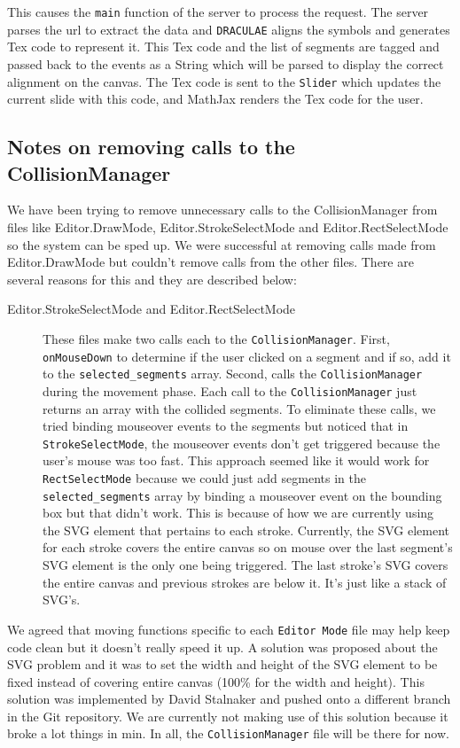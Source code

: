 \documentclass[letterpaper]{article}
\begin{document}
This causes the \verb+main+ function of the server to process the request. The server parses
the url to extract the data and \verb+DRACULAE+ aligns the symbols and generates Tex code to
represent it. This Tex code and the list of segments are tagged and passed back to the events
as a String which will be parsed to display the correct alignment on the canvas. The Tex code
is sent to the \verb+Slider+ which updates the current slide with this code, and MathJax renders
the Tex code for the user.

\subsection*{Notes on removing calls to the CollisionManager}
We have been trying to remove unnecessary calls to the CollisionManager from files like
Editor.DrawMode, Editor.StrokeSelectMode and Editor.RectSelectMode so the system can be sped up.
We were successful at removing calls made from Editor.DrawMode but couldn't remove calls
from the other files. There are several reasons for this and they are described below:

\begin{description}
	\item[Editor.StrokeSelectMode and Editor.RectSelectMode] These files make two calls each to
		the \verb+CollisionManager+. First, \verb+onMouseDown+ to determine if the user
		clicked on a segment and if so, add it to the \verb+selected_segments+ array. Second,
		calls the \verb+CollisionManager+ during the movement phase. Each call to the
		\verb+CollisionManager+ just returns an array with the collided segments. To eliminate
		these calls, we tried binding mouseover events to the segments but noticed that in
		\verb+StrokeSelectMode+, the mouseover events don't get triggered because the user's
		mouse was too fast. This approach seemed like it would work for \verb+RectSelectMode+
		because we could just add segments in the \verb+selected_segments+ array by binding a
		mouseover event on the bounding box but that didn't work. This is because of how we are
		currently using the SVG element that pertains to each stroke. Currently, the SVG element
		for each stroke covers the entire canvas so on mouse over the last segment's SVG element
		is the only one being triggered. The last stroke's SVG covers the entire canvas and
		previous strokes are below it. It's just like a stack of SVG's.
\end{description}

We agreed that moving functions specific to each \verb+Editor Mode+ file may help keep code clean
but it doesn't really speed it up. A solution was proposed about the SVG problem and it was
to set the width and height of the SVG element to be fixed instead of covering entire 
canvas (100\% for the width and height). This solution was 
implemented by David Stalnaker and pushed onto a different branch in the Git repository. 
We are currently not making use of this solution because it broke a lot things in min. 
In all, the \verb+CollisionManager+ file will be there for now. 
		
\end{document}
